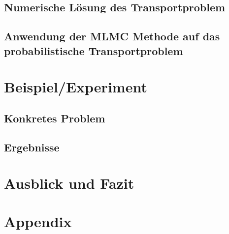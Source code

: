 \documentclass[12pt,a4paper]{scrartcl}
\theoremstyle{definition}
\numberwithin{equation}{section}
\begin{document}
\subsection{Numerische Lösung des Transportproblem}

\newpage  %
\subsection{Anwendung der MLMC Methode auf das probabilistische Transportproblem}
\newpage  %
\section{Beispiel/Experiment}
\subsection{Konkretes Problem}

\subsection{Ergebnisse}
\newpage  %
\section{Ausblick und Fazit}

\section{Appendix}


  \newpage

  
  
 
      

\newpage
  
 \thispagestyle{empty}


\vspace*{8cm}
\end{document}
